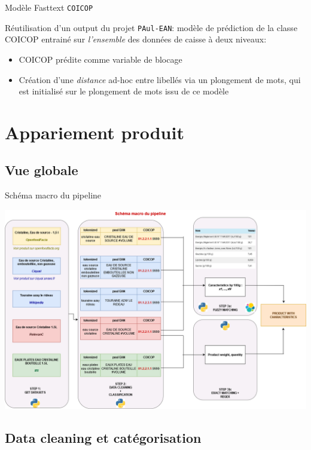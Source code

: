 \documentclass[ignorenonframetext,]{beamer}
\begin{document}
\begin{frame}{Modèle Fasttext \texttt{COICOP}}

Réutilisation d'un output du projet \texttt{PAul-EAN}: modèle de prédiction de la classe COICOP entrainé sur \textit{l'ensemble} des données de caisse à deux niveaux:

\begin{itemize}
    \item COICOP prédite comme variable de blocage
    \item Création d'une \textit{distance} ad-hoc entre libellés via un plongement de mots, qui est initialisé sur le plongement de mots issu de ce modèle 
\end{itemize}
    
\end{frame}

\section{Appariement produit}\label{sec: appariement produit}

\subsection{Vue globale}

\begin{frame}{Schéma macro du pipeline}

\includegraphics[width = \linewidth]{images/macro.png}

\end{frame}

\subsection{Data cleaning et catégorisation}
\end{document}

